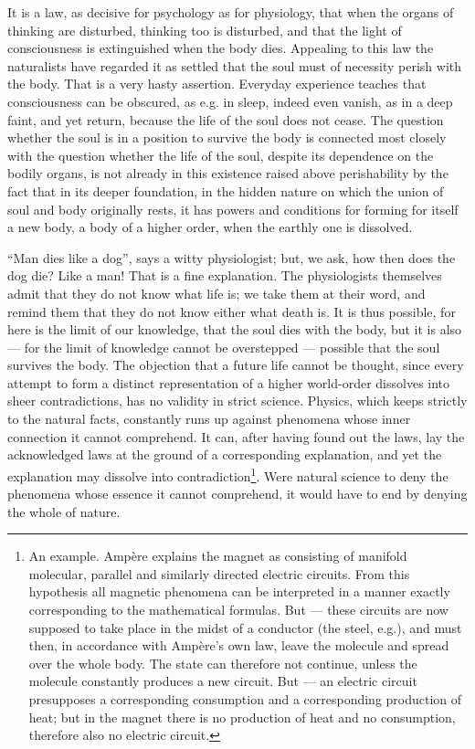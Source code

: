 \documentclass[12pt,a4paper,openany]{book}
\newcommand{\opage}[1]{\marginnote{\footnotesize\textit{[#1]}}}
\begin{document}
It is a law, as decisive for psychology
as for physiology, that when the organs of thinking are disturbed,
thinking too is disturbed, and that the light of
consciousness is extinguished when the body dies. Appealing
to this law the naturalists have regarded it
as settled that the soul must of necessity perish
with the body. That is a very hasty assertion.
Everyday experience teaches that consciousness can be
obscured, as e.g. in sleep, indeed even vanish, as
\setcounter{footnote}{0}%
\opage{399}in a deep faint, and yet return, because the
life of the soul does not cease. The question whether the soul
is in a position to survive the body is connected most
closely with the question whether the life of the soul,
despite its dependence on the bodily organs, is not
already in this existence raised above perishability
by the fact that in its deeper foundation, in
the hidden nature on which the union of soul and
body originally rests, it has powers and conditions
for forming for itself a new body, a body of a higher
order, when the earthly one is dissolved.

``Man dies like a dog'', says a witty
physiologist; but, we ask, how then does the dog die?
Like a man! That is a fine explanation. The physiologists
themselves admit that they do not know what life is;
we take them at their word, and remind them that they do not
know either what death is. It is thus possible, for here is
the limit of our knowledge, that the soul dies with the body,
but it is also --- for the limit of knowledge cannot
be overstepped --- possible that the soul survives the body.
The objection that a future life cannot be
thought, since every attempt to form a distinct
representation of a higher world-order dissolves into
sheer contradictions, has no validity in strict
science. Physics, which keeps strictly to the natural
facts, constantly runs up against phenomena
whose inner connection it cannot comprehend. It
can, after having found out the laws, lay the acknowledged
laws at the ground of a corresponding explanation,
and yet the explanation may dissolve into
\setcounter{footnote}{0}%
\opage{400}contradiction\footnote[1]{An example. Ampère explains the magnet as consisting of manifold molecular, parallel and similarly directed electric circuits. From this hypothesis all magnetic phenomena can be interpreted in a manner exactly corresponding to the mathematical formulas. But --- these circuits are now supposed to take place in the midst of a conductor (the steel, e.g.), and must then, in accordance with Ampère's own law, leave the molecule and spread over the whole body. The state can therefore not continue, unless the molecule constantly produces a new circuit. But --- an electric circuit presupposes a corresponding consumption and a corresponding production of heat; but in the magnet there is no production of heat and no consumption, therefore also no electric circuit.}. Were natural science to deny the phenomena whose
essence it cannot comprehend, it would have to end by
denying the whole of nature.
\end{document}
